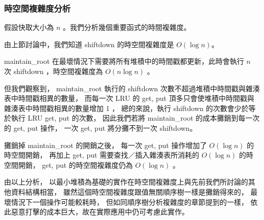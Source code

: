 \subsubsection{時空間複雜度分析}

假設快取大小為 $n$ 。我們分析幾個重要函式的時間複雜度。

由上節討論中，我們知道 shiftdown 的時空間複雜度是 $O(\log n)$。

maintain\_root 在最壞情況下需要將所有堆積中的時間戳都更新，此時會執行 $n$ 次 shiftdown ，時空間複雜度為 $O(n \log n)$ 。

但我們觀察到，
maintain\_root 執行的 shiftdown 次數不超過堆積中時間戳與雜湊表中時間戳相異的數量，
而每一次 LRU 的 get, put 頂多只會使堆積中時間戳與雜湊表中時間戳相異的數量增加 1 ，
總的來說，執行 shiftdown 的次數會少於等於執行 LRU get, put 的次數，
因此我們若將 maintain\_root 的成本攤銷到每一次的 get, put 操作，
一次 get, put 將分攤不到一次 shiftdown。

攤銷掉 maintain\_root 的開銷之後，
每一次 get, put 操作增加了 $O(\log n)$ 的時空間開銷，
再加上 get, put 需要查找／插入雜湊表所消耗的 $O(\log n)$ 的時空間開銷，
get, put 的時空間複雜度仍為 $O(\log n)$ 。

由以上分析，
以最小堆積為基礎的實作在時空間複雜度上與先前我們所討論的其他資料結構相當，
雖然這個時空間複雜度跟值無關順序樹一樣是攤銷得來的，
最壞情況下一個操作可能較耗時，
但如同順序樹分析複雜度的章節提到的一樣，
依此惡意打擊的成本巨大，故在實際應用中仍可考慮此實作。